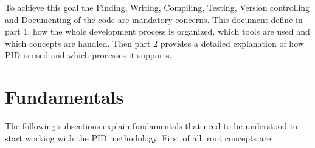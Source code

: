 \documentclass[12pt,a4paper]{article}
\begin{document}
To achieve this goal the Finding, Writing, Compiling, Testing, Version controlling and Documenting of the code are mandatory concerns. This document define in part 1, how the whole development process is organized, which tools are used and which concepts are handled. Then part 2 provides a detailed explanation of how PID is used and which processes it supports.

\pagebreak

\tableofcontents

\pagebreak

\part{Fundamentals}

The following subsections explain fundamentals that need to be understood to start working with the PID methodology. First of all, root concepts are:
\end{document}
